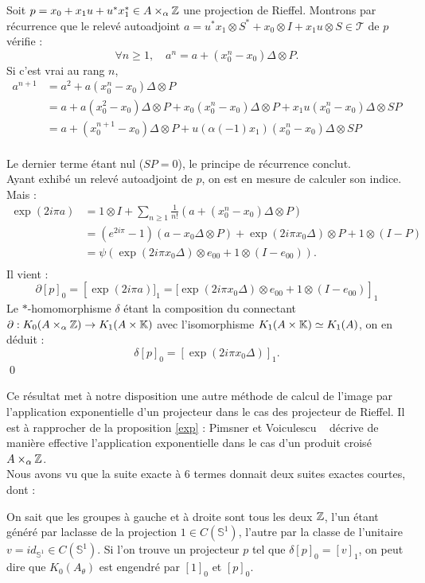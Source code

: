 \begin{dem}
Soit $p=x_0+x_1 u +u^*x_1^*\in A\times_\alpha \mathbb Z $ une projection de Rieffel. Montrons par récurrence que le relevé autoadjoint $a=u^*x_1\otimes S^*+x_0\otimes I +x_1 u\otimes S\in \mathcal T$ de $p$ vérifie :
\[\forall n \geq 1, \quad a^n = a+(x_0^n-x_0)\Delta\otimes P.\]
Si c'est vrai au rang $n$,\\
\begin{align*}
a^{n+1} &=a^2+a(x_0^n-x_0)\Delta\otimes P \\
		& =a+a(x_0^2-x_0)\Delta\otimes P+x_0(x_0^n-x_0)\Delta\otimes P+x_1u(x_0^n-x_0)\Delta\otimes SP \\
		& = a+(x_0^{n+1}-x_0)\Delta\otimes P+ u(\alpha(-1)x_1)(x_0^n-x_0)\Delta\otimes SP\\
\end{align*}

Le dernier terme étant nul ($SP=0$), le principe de récurrence conclut.\\

Ayant exhibé un relevé autoadjoint de $p$, on est en mesure de calculer son indice. Mais :
\begin{align*}
\exp(2i\pi a ) &=1\otimes I+\sum_{n\geq 1}\frac{1}{n!}( a+(x_0^n-x_0)\Delta\otimes P)\\
		& = (e^{2i\pi}-1)(a-x_0\Delta \otimes P)+\exp(2i\pi x_0\Delta)\otimes P + 1\otimes (I-P)\\
		& =\psi\left(\exp(2i\pi x_0\Delta)\otimes e_{00} + 1\otimes (I-e_{00})\right).\\
\end{align*}
Il vient : 
\[\partial [p]_0=\left[\exp(2i\pi a )]_1=[\exp(2i\pi x_0\Delta)\otimes e_{00} + 1\otimes (I-e_{00}) \right]_1\]
Le $*$-homomorphisme $\delta$ étant la composition du connectant $\partial : K_0(A\times_\alpha \mathbb Z)\rightarrow K_1(A\times \mathbb K)$ avec l'isomorphisme $K_1(A\times \mathbb K)\simeq K_1(A)$, on en déduit :
\[\delta[p]_0=[\exp(2i\pi x_0\Delta)]_1.\]
\qed
\end{dem}

Ce résultat met à notre disposition une autre méthode de calcul de l'image par l'application exponentielle d'un projecteur dans le cas des projecteur de Rieffel. Il est à rapprocher de la proposition \ref{exp} : Pimsner et Voiculescu ~\cite{PV} décrive de manière effective l'application exponentielle dans le cas d'un produit croisé $A\times _\alpha \mathbb Z$.\\

Nous avons vu que la suite exacte à $6$ termes donnait deux suites exactes courtes, dont :\\
On sait que les groupes à gauche et à droite sont tous les deux $\mathbb Z$, l'un étant généré par laclasse de la projection $1\in C(\mathbb S^1)$, l'autre par la classe de l'unitaire $v=id_{\mathbb S^1}\in  C(\mathbb S^1)$. Si l'on trouve un projecteur $p$ tel que $\delta [p]_0=[v]_1$, on peut dire que $K_0(A_\theta)$ est engendré par $[1]_0$ et $[p]_0$.

